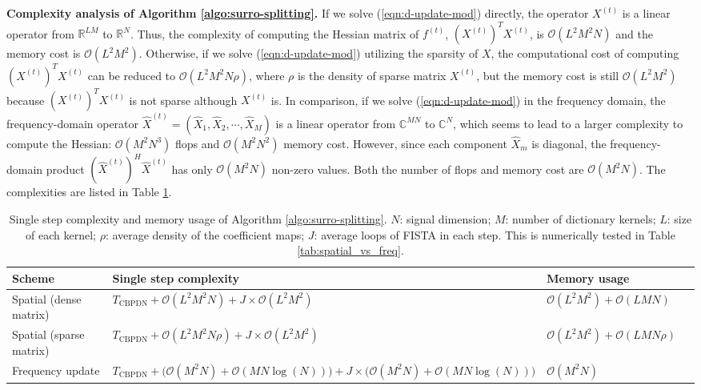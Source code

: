 \documentclass[final]{siamart1116}
\def \co {\mathcal{O}}
\def \R  {\mathbb{R}}
\def \C  {\mathbb{C}}
\begin{document}
\textbf{Complexity analysis of Algorithm \ref{algo:surro-splitting}.}
If we solve (\ref{eqn:d-update-mod}) directly, the operator $X^{(t)}$ is a linear operator from $\R^{LM}$ to $\R^{N}$. Thus, the complexity of computing the Hessian matrix of $f^{(t)}$, $(X^{(t)})^T X^{(t)}$, is $\co(L^2M^2N)$ and the memory cost is $\co(L^2M^2)$.
Otherwise, if we solve (\ref{eqn:d-update-mod}) utilizing the sparsity of $X$, the computational cost of computing $(X^{(t)})^T X^{(t)}$ can be reduced to $\co(L^2M^2N\rho)$, where $\rho$ is the density of sparse matrix $X^{(t)}$, but the memory cost is still $\co(L^2M^2)$ because $(X^{(t)})^T X^{(t)}$ is not sparse although $X^{(t)}$ is.
In comparison, if we solve (\ref{eqn:d-update-mod}) in the frequency domain, the frequency-domain operator $\hat{X}^{(t)} = (\hat{X}_1, \hat{X}_2, \cdots, \hat{X}_M)$ is a linear operator from $\C^{MN}$ to $\C^{N}$, which seems to lead to a larger complexity to compute the Hessian: $\co(M^2N^3)$ flops and $\co(M^2N^2)$ memory cost. However, since each component $\hat{X}_m$ is diagonal, the frequency-domain product $(\hat{X}^{(t)})^H \hat{X}^{(t)}$ has only $\co(M^2N)$ non-zero values. Both the number of flops and memory cost are $\co(M^2N)$.  The complexities are listed in Table \ref{tab:surro}.


\begin{table}[t]
\centering
\begin{tabular}{|b{0.268\linewidth}|b{0.48\linewidth}|b{0.268\linewidth}|}
\hline
Scheme & Single step complexity & Memory usage\\
\hline \hline
Spatial (dense matrix) & $T_{\text{CBPDN}} + \co(L^2M^2N) + J \times \co(L^2M^2)$ & $\co(L^2M^2) + \co(LMN)$\\
\hline
Spatial (sparse matrix) & $T_{\text{CBPDN}} +\co(L^2M^2N\rho) + J \times \co(L^2M^2)$ & $\co(L^2M^2) + \co(LMN\rho)$\\
\hline
Frequency update & $T_{\text{CBPDN}} + \big(\co(M^2N) + \co(MN\log(N)) \big) + J \times \big(\co(M^2N)+\co(MN\log(N))\big)$ & $\co(M^2N)$\\
\hline
\end{tabular}
\caption{Single step complexity and memory usage of Algorithm \ref{algo:surro-splitting}. $N$: signal dimension; $M$: number of dictionary kernels; $L$: size of each kernel; $\rho$: average density of the coefficient maps; $J$: average loops of FISTA in each step. This is numerically tested in Table \ref{tab:spatial_vs_freq}.
}
\label{tab:surro}
\end{table}
\end{document}

